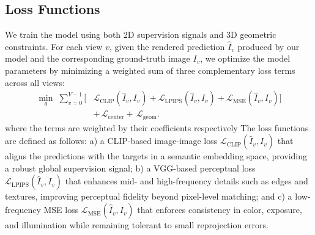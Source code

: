 \documentclass[10pt,twocolumn,letterpaper]{article}
\begin{document}
\subsection{Loss Functions}
We train the model using both 2D supervision signals and 3D geometric constraints.  
%
For each view $v$, given the rendered prediction $\hat I_v$ produced by our model and the corresponding ground-truth image $I_v$, 
we optimize the model parameters by minimizing a weighted sum of three complementary loss terms across all views:
\begin{equation*}
\begin{split}
\label{eq:edit-loss}
\min_{\theta}\; \sum_{v=0}^{V-1}\Big[
&\mathcal{L}_{\text{CLIP}}(\hat I_v, I_v)
+\mathcal{L}_{\text{LPIPS}}(\hat I_v, I_v)
+\mathcal{L}_{\text{MSE}}(\hat I_v, I_v)
\Big] \\
&+\, \mathcal{L}_{\text{center}}
+\, \mathcal{L}_{\text{geom}}.
\end{split}
\end{equation*}
where the terms are weighted by their coefficients respectively
%
The loss functions are defined as follows:  
a) a CLIP-based image-image loss $\mathcal{L}_{\text{CLIP}}(\hat I_v, I_v)$ that aligns the predictions with the targets in a semantic embedding space, providing a robust global supervision signal;  
b) a VGG-based perceptual loss $\mathcal{L}_{\text{LPIPS}}(\hat I_v, I_v)$ that enhances mid- and high-frequency details such as edges and textures, improving perceptual fidelity beyond pixel-level matching; and  
c) a low-frequency MSE loss $\mathcal{L}_{\text{MSE}}(\hat I_v, I_v)$ that enforces consistency in color, exposure, and illumination while remaining tolerant to small reprojection errors.
\end{document}
